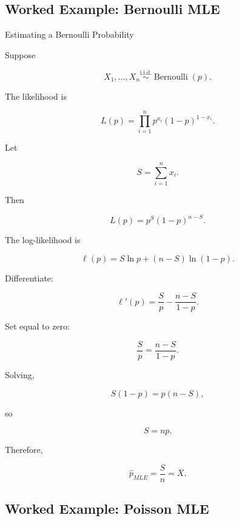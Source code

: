 \subsection{Worked Example: Bernoulli MLE}
\label{subsec:worked-bernoulli-mle}

\begin{workedexamplebox}{Estimating a Bernoulli Probability}

Suppose

\[
X_1,\ldots,X_n
\overset{\text{i.i.d.}}{\sim}
\operatorname{Bernoulli}(p).
\]

The likelihood is

\[
L(p)
=
\prod_{i=1}^{n}
p^{x_i}
(1-p)^{1-x_i}.
\]

Let

\[
S
=
\sum_{i=1}^{n}x_i.
\]

Then

\[
L(p)
=
p^S(1-p)^{n-S}.
\]

The log-likelihood is

\[
\ell(p)
=
S\ln p
+
(n-S)\ln(1-p).
\]

Differentiate:

\[
\ell'(p)
=
\frac{S}{p}
-
\frac{n-S}{1-p}.
\]

Set equal to zero:

\[
\frac{S}{p}
=
\frac{n-S}{1-p}.
\]

Solving,

\[
S(1-p)=p(n-S),
\]

so

\[
S=np.
\]

Therefore,

\begin{answerbox}
\[
\boxed{
\widehat{p}_{MLE}
=
\frac Sn
=
\overline{X}.
}
\]
\end{answerbox}

\end{workedexamplebox}

\subsection{Worked Example: Poisson MLE}
\label{subsec:worked-poisson-mle}


